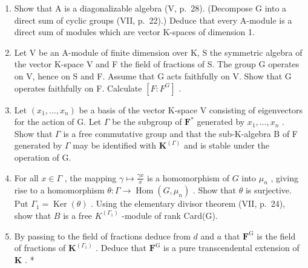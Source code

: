 \begin{enumerate}
\def\labelenumi{\alph{enumi})}
\item
  Show that A is a diagonalizable algebra (V, p.~28). (Decompose G into a direct sum of cyclic groups (VII, p.~22).) Deduce that every A-module is a direct sum of modules which are vector K-spaces of dimension 1.
\item
  Let V be an A-module of finite dimension over K, S the symmetric algebra of the vector K-space V and F the field of fractions of S. The group G operates on V, hence on S and F. Assume that G acts faithfully on V. Show that G operates faithfully on F. Calculate \([F : F^{G}]\) .
\item
  Let \((x_{1},\ldots ,x_{n})\) be a basis of the vector K-space V consisting of eigenvectors for the action of G. Let \(\Gamma\) be the subgroup of \(\mathbf{F}^*\) generated by \(x_{1},\ldots ,x_{n}\) . Show that \(\Gamma\) is a free commutative group and that the sub-K-algebra B of F generated by \(\Gamma\) may be identified with \(\mathbf{K}^{(\Gamma)}\) and is stable under the operation of G.
\item
  For all \(x \in \Gamma\) , the mapping \(\gamma \mapsto \frac{\gamma x}{x}\) is a homomorphism of \(G\) into \(\mu_n\) , giving rise to a homomorphism \(\theta: \Gamma \to \operatorname{Hom}(G, \mu_n)\) . Show that \(\theta\) is surjective. Put \(\Gamma_1 = \operatorname{Ker}(\theta)\) . Using the elementary divisor theorem (VII, p.~24), show that \(B\) is a free \(K^{(\Gamma_1)}\) -module of rank Card(G).
\item
  By passing to the field of fractions deduce from \(d\) and \(a\) that \(\mathbf{F}^{\mathrm{G}}\) is the field of fractions of \(\mathbf{K}^{(\Gamma_1)}\) . Deduce that \(\mathbf{F}^{\mathrm{G}}\) is a pure transcendental extension of \(\mathbf{K}\) . *
\end{enumerate}


